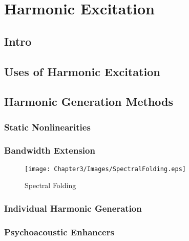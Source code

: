 \chapter{Harmonic Excitation}

\section{Intro}

\section{Uses of Harmonic Excitation}

\section{Harmonic Generation Methods}
	\subsection{Static Nonlinearities}

	\subsection{Bandwidth Extension}
		\begin{figure}[h!]
			\centering
			\texttt{[image: Chapter3/Images/SpectralFolding.eps]}
			\caption{Spectral Folding}
		\end{figure}

	\subsection{Individual Harmonic Generation}

	\subsection{Psychoacoustic Enhancers}

